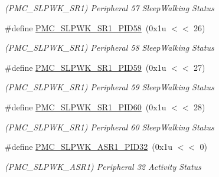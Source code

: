 \begin{DoxyCompactItemize}
\begin{DoxyCompactList}\small\item\em (P\+M\+C\+\_\+\+S\+L\+P\+W\+K\+\_\+\+S\+R1) Peripheral 57 Sleep\+Walking Status \end{DoxyCompactList}\item 
\mbox{\label{group__SAMS70__PMC_gaa52b4dbc91552c8cd37ef2797917e933}} 
\#define \mbox{\hyperlink{group__SAMS70__PMC_gaa52b4dbc91552c8cd37ef2797917e933}{P\+M\+C\+\_\+\+S\+L\+P\+W\+K\+\_\+\+S\+R1\+\_\+\+P\+I\+D58}}~(0x1u $<$$<$ 26)
\begin{DoxyCompactList}\small\item\em (P\+M\+C\+\_\+\+S\+L\+P\+W\+K\+\_\+\+S\+R1) Peripheral 58 Sleep\+Walking Status \end{DoxyCompactList}\item 
\mbox{\label{group__SAMS70__PMC_ga37ee13ef18e767c49075089e51f626f9}} 
\#define \mbox{\hyperlink{group__SAMS70__PMC_ga37ee13ef18e767c49075089e51f626f9}{P\+M\+C\+\_\+\+S\+L\+P\+W\+K\+\_\+\+S\+R1\+\_\+\+P\+I\+D59}}~(0x1u $<$$<$ 27)
\begin{DoxyCompactList}\small\item\em (P\+M\+C\+\_\+\+S\+L\+P\+W\+K\+\_\+\+S\+R1) Peripheral 59 Sleep\+Walking Status \end{DoxyCompactList}\item 
\mbox{\label{group__SAMS70__PMC_ga0fba1f8f21ab792628bcfbadf8414caf}} 
\#define \mbox{\hyperlink{group__SAMS70__PMC_ga0fba1f8f21ab792628bcfbadf8414caf}{P\+M\+C\+\_\+\+S\+L\+P\+W\+K\+\_\+\+S\+R1\+\_\+\+P\+I\+D60}}~(0x1u $<$$<$ 28)
\begin{DoxyCompactList}\small\item\em (P\+M\+C\+\_\+\+S\+L\+P\+W\+K\+\_\+\+S\+R1) Peripheral 60 Sleep\+Walking Status \end{DoxyCompactList}\item 
\mbox{\label{group__SAMS70__PMC_gaed7cd2ef02c6f1713bdccbe5129452e6}} 
\#define \mbox{\hyperlink{group__SAMS70__PMC_gaed7cd2ef02c6f1713bdccbe5129452e6}{P\+M\+C\+\_\+\+S\+L\+P\+W\+K\+\_\+\+A\+S\+R1\+\_\+\+P\+I\+D32}}~(0x1u $<$$<$ 0)
\begin{DoxyCompactList}\small\item\em (P\+M\+C\+\_\+\+S\+L\+P\+W\+K\+\_\+\+A\+S\+R1) Peripheral 32 Activity Status \end{DoxyCompactList}\item 

\end{DoxyCompactItemize}
